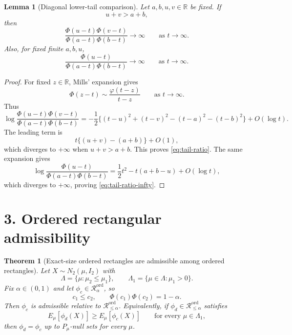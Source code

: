 \documentclass[12pt]{article}
\newtheorem{theorem}{Theorem}
\newtheorem{lemma}{Lemma}
\theoremstyle{definition}
\theoremstyle{remark}
\begin{document}
\begin{lemma}[Diagonal lower-tail comparison]\label{lem:tail-ratio}
Let $a,b,u,v\in\mathbb R$ be fixed. If
\[
u+v>a+b,
\]
then
\begin{equation}\label{eq:tail-ratio}
\frac{\Phi(u-t)\Phi(v-t)}{\Phi(a-t)\Phi(b-t)}\longrightarrow\infty
\qquad\text{as }t\to\infty.
\end{equation}
Also, for fixed finite $a,b,u$,
\begin{equation}\label{eq:tail-ratio-infty}
\frac{\Phi(u-t)}{\Phi(a-t)\Phi(b-t)}\longrightarrow\infty
\qquad\text{as }t\to\infty.
\end{equation}
\end{lemma}

\begin{proof}
For fixed $z\in\mathbb R$, Mills' expansion gives
\[
\Phi(z-t)
\sim
\frac{\varphi(t-z)}{t-z}
\qquad\text{as }t\to\infty.
\]
Thus
\[
\log\frac{\Phi(u-t)\Phi(v-t)}{\Phi(a-t)\Phi(b-t)}
=
-\frac12\{(t-u)^2+(t-v)^2-(t-a)^2-(t-b)^2\}+O(\log t).
\]
The leading term is
\[
t\{(u+v)-(a+b)\}+O(1),
\]
which diverges to $+\infty$ when $u+v>a+b$. This proves \eqref{eq:tail-ratio}. The same expansion gives
\[
\log\frac{\Phi(u-t)}{\Phi(a-t)\Phi(b-t)}
=
\frac12t^2-t(a+b-u)+O(\log t),
\]
which diverges to $+\infty$, proving \eqref{eq:tail-ratio-infty}.
\end{proof}

\section*{3. Ordered rectangular admissibility}

\begin{theorem}[Exact-size ordered rectangles are admissible among ordered rectangles]\label{thm:ordered-rectangle-admissibility}
Let $X\sim N_2(\mu,I_2)$ with
\[
\Lambda=\{\mu:\mu_2\le\mu_1\},
\qquad
\Lambda_1=\{\mu\in\Lambda:\mu_1>0\}.
\]
Fix $\alpha\in(0,1)$ and let $\phi_c\in\mathcal R^{\mathrm{ord}}_{\alpha}$, so
\[
c_1\le c_2,
\qquad
\Phi(c_1)\Phi(c_2)=1-\alpha.
\]
Then $\phi_c$ is admissible relative to $\mathcal R^{\mathrm{ord}}_{\le\alpha}$.
Equivalently, if $\phi_d\in\mathcal R^{\mathrm{ord}}_{\le\alpha}$ satisfies
\[
E_\mu[\phi_d(X)]\ge E_\mu[\phi_c(X)]
\qquad\text{for every }\mu\in\Lambda_1,
\]
then $\phi_d=\phi_c$ up to $P_\mu$-null sets for every $\mu$.
\end{theorem}
\end{document}
